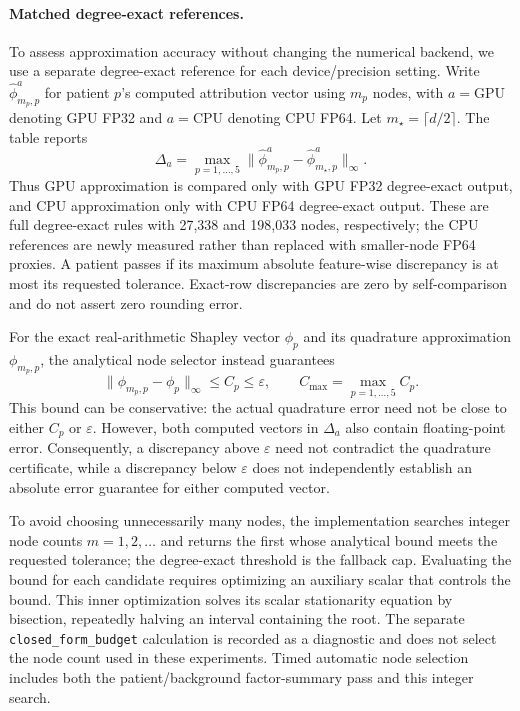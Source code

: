 \paragraph{Matched degree-exact references.}
To assess approximation accuracy without changing the numerical backend,
we use a separate degree-exact reference for each device/precision setting.
Write $\widehat\phi^{a}_{m_p,p}$ for patient $p$'s computed attribution
vector using $m_p$ nodes, with $a=\mathrm{GPU}$ denoting GPU FP32 and
$a=\mathrm{CPU}$ denoting CPU FP64. Let $m_\star=\lceil d/2\rceil$.
The table reports
\[
\Delta_a=\max_{p=1,\ldots,5}
\|\widehat\phi^{a}_{m_p,p}-\widehat\phi^{a}_{m_\star,p}\|_\infty.
\]
Thus GPU approximation is compared only with GPU FP32 degree-exact output,
and CPU approximation only with CPU FP64 degree-exact output. These are
full degree-exact rules with 27,338 and 198,033 nodes, respectively; the
CPU references are newly measured rather than replaced with smaller-node
FP64 proxies. A patient passes if its maximum absolute feature-wise
discrepancy is at most its requested tolerance. Exact-row discrepancies
are zero by self-comparison and do not assert zero rounding error.

For the exact real-arithmetic Shapley vector $\phi_p$ and its quadrature
approximation $\phi_{m_p,p}$, the analytical node selector instead guarantees
\[
\|\phi_{m_p,p}-\phi_p\|_\infty\le C_p\le\varepsilon,
\qquad C_{\max}=\max_{p=1,\ldots,5}C_p.
\]
This bound can be conservative: the actual quadrature error need not be
close to either $C_p$ or $\varepsilon$. However, both computed vectors in
$\Delta_a$ also contain floating-point error. Consequently, a discrepancy
above $\varepsilon$ need not contradict the quadrature certificate, while
a discrepancy below $\varepsilon$ does not independently establish an
absolute error guarantee for either computed vector.

To avoid choosing unnecessarily many nodes, the implementation searches
integer node counts $m=1,2,\ldots$ and returns the first whose analytical
bound meets the requested tolerance; the degree-exact threshold is the
fallback cap. Evaluating the bound for each candidate requires optimizing
an auxiliary scalar that controls the bound. This inner optimization solves
its scalar stationarity equation by bisection, repeatedly halving an interval
containing the root. The separate \texttt{closed\_form\_budget} calculation
is recorded as a diagnostic and does not select the node count used in
these experiments. Timed automatic node selection includes both the
patient/background factor-summary pass and this integer search.

